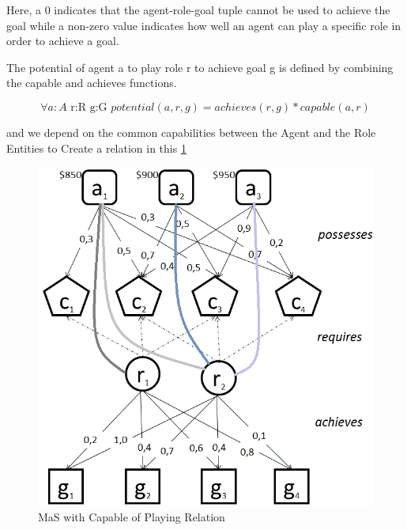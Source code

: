 Here, a 0 indicates that the agent-role-goal tuple cannot be
used to achieve the goal while a non-zero value indicates how well an agent can play
a specific role in order to achieve a goal.  

The potential of agent a to play role r 
to achieve goal g is defined by combining the capable and achieves functions.\cite{omacs4}

\begin{equation}
\forall a:A\textrm{ r:R g:G }potential(a,r,g)=achieves(r,g)*capable(a,r)\label{eq:potentialFunc}
\end{equation}

and we depend on the common capabilities between the Agent and the Role Entities to Create a relation in this \ref{fig:Capable Of playing Relation} 




\begin{figure}[th]
	\centering
		\includegraphics[scale=0.5]{chapiter1/img/mag}
	\caption{\label{fig:Capable Of playing Relation} MaS with Capable of Playing Relation \cite{omacs0} }
\end{figure}

































